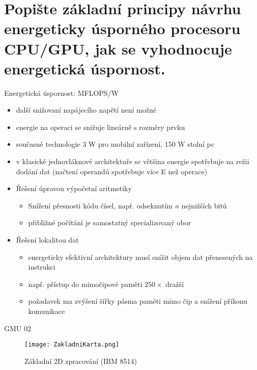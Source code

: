 




\newcommand\courseShortcut{GMU}
\newcommand\courseName{Grafické a multimediální procesory}
\newcommand\projectName{Příprava na zkoušku}




	


\section{Popište základní principy návrhu energeticky úsporného procesoru CPU/GPU, jak se vyhodnocuje energetická úspornost.}
	Energetická úspornost: MFLOPS/W
	\begin{itemize}
		\setlength\itemsep{0em}
		\item další snižovaní napájecího napětí není možné
		\item energie na operaci se snižuje lineárně s rozměry prvku
		\item současné technologie 3 W pro mobilní zařízení, 150 W stolní pc
		\item v klasické jednovláknové architektuře se většina energie spotřebuje na režii dodání dat (načtení operandů spotřebuje více E než operace)
		\item Řešení úpravou výpočetní aritmetiky
			\begin{itemize}
				\setlength\itemsep{0em}
				\item Snížení přesnosti kódu čísel, např. odseknutím $n$ nejnižších bitů
				\item přibližné počítání je samostatný specializovaný obor
			\end{itemize}			
		\item Řešení lokalitou dat
			\begin{itemize}
				\setlength\itemsep{0em}
				\item energeticky efektivní architektury musí snížit objem dat přenesených na instrukci
				\item např. přístup do mimočipové paměti $250\times$ dražší
				\item požadavek ma zvýšení šířky pásma paměti mimo čip a snížení příkonu komunikace
			\end{itemize}	
	\end{itemize}
	

	GMU 02
	\begin{figure}[h]
		\centering
		\texttt{[image: ZakladniKarta.png]}
		\caption{Základní 2D zpracování (IBM 8514)}
		\label{fig:ZakladniKarta}
	\end{figure}

